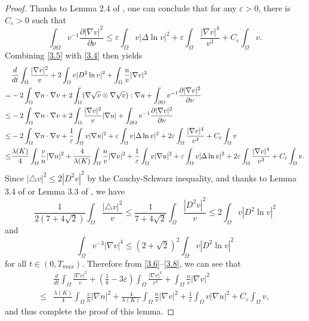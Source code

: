 \documentclass[12pt]{article}
\theoremstyle{plain}
\theoremstyle{definition}
\numberwithin{equation}{section}
\begin{document}
\begin{proof}[Proof]
Thanks to Lemma 2.4 of \cite{Jiang}, one can conclude that for any $\varepsilon>0$, there is $C_{\varepsilon}>0$ such that
\begin{equation}\label{3.5}
\int_{\partial\Omega}v^{-1}\frac {\partial |\nabla v|^2}{\partial \nu} \leq \varepsilon\int_\Omega v|\Delta\ln v|^2+\varepsilon
\int_\Omega \frac{|\nabla v|^4}{v^3}+C_\varepsilon\int_{\Omega}v.
\end{equation}
Combining  \eqref{3.5} with   \eqref{3.4} then yields
\begin{align}\label{3.6}
&\frac d{dt} \int_\Omega  \frac{|\nabla v|^2}v
+2\int_\Omega v|D^2\ln v|^2+ \int_\Omega \frac nv |\nabla v|^2\notag\\
= & -2\int_\Omega \nabla n\cdot\nabla v+2
\int_\Omega (\nabla\sqrt{v}\otimes\nabla \sqrt{v}):\nabla u+\int_{\partial\Omega}v^{-1}\frac {\partial |\nabla v|^2}{\partial \nu}\\
\leq & -2\int_\Omega \nabla n\cdot\nabla v+2
\int_\Omega \frac{|\nabla v|^2}{v}|\nabla u|+\int_{\partial\Omega}v^{-1}\frac {\partial |\nabla v|^2}{\partial \nu}\notag\\
\leq & -2\int_\Omega \nabla n\cdot\nabla v+  \frac1{\varepsilon}
\int_\Omega v |\nabla u|^2+\varepsilon\int_\Omega v|\Delta\ln v|^2+
2\varepsilon
\int_\Omega \frac{|\nabla v|^4}{v^3}+C_\varepsilon\int_{\Omega}v
\notag\\
\leq &
\frac{\lambda(K)} 4\int_\Omega\frac{v}{n}|\nabla n|^2
+
\frac4{\lambda(K)} \int_\Omega\frac nv |\nabla v|^2 +\frac1{\varepsilon}
\int_\Omega v |\nabla u|^2+\varepsilon\int_\Omega v|\Delta\ln v|^2+
2\varepsilon
\int_\Omega \frac{|\nabla v|^4}{v^3}+C_\varepsilon\int_{\Omega}v.\notag
\end{align}
Since $ |\triangle v|^2\leq 2|D^2 v|^2$ by the Cauchy-Schwarz inequality, and thanks to Lemma 3.4 of \cite{WinklerNARWA} or Lemma 3.3 of \cite{WinklerDCDSB(2022)}, we have \begin{equation}\label{3.7}
\frac 1 {2(7 + 4\sqrt{2})}\int_\Omega\frac {|\triangle v|^2}{v}\leq
\frac 1 {7 + 4\sqrt{2}}
\int_\Omega\frac{|D^2 v|^2}{v}\leq 2 \int_\Omega v|D^2\ln v|^2
\end{equation}
and \begin{equation}\label{3.8}
\int_\Omega v^{-3}|\nabla v|^4\leq (2+\sqrt{2})^2 \int_\Omega v|D^2\ln v|^2
\end{equation}
for all $t\in (0, T_{max})$.
Therefore from \eqref{3.6}--\eqref{3.8}, we can see  that
\begin{equation}\label{3.9}
\begin{split}
&\frac d{dt} \int_\Omega  \frac{|\nabla v|^2}v
+(\frac18-3\varepsilon)\int_\Omega \frac{|\nabla v|^4}{v^3}
+ \int_\Omega \frac nv |\nabla v|^2\\
\leq &
\frac{\lambda(K)} 4\int_\Omega\frac{v}{n}|\nabla n|^2
+
\frac4{\lambda(K)} \int_\Omega\frac nv |\nabla v|^2 +\frac1{\varepsilon}
\int_\Omega v |\nabla u|^2+C_\varepsilon\int_{\Omega}v,
\end{split}
\end{equation}
and thus complete the proof of this lemma.
\end{proof}
\end{document}
